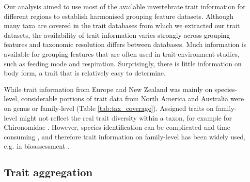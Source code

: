 \documentclass{article}
\begin{document}
Our analysis aimed to use most of the available invertebrate trait information for different regions to establish harmonised grouping feature datasets. Although many taxa are covered in the trait databases from which we extracted our trait datasets, the availability of trait information varies strongly across grouping features and taxonomic resolution differs between databases. Much information is available for grouping features that are often used in trait-environment studies, such as feeding mode and respiration. Surprisingly, there is little information on body form, a trait that is relatively easy to determine. 

While trait information from Europe and New Zealand was mainly on species-level, considerable portions of trait data from North America and Australia were on genus or family-level (Table \ref{tab:tax_coverage}). Assigned traits on family-level might not reflect the real trait diversity within a taxon, for example for Chironomidae \cite{serra_synthesising_2016}. However, species identification can be complicated and time-consuming \cite{marshall_taxonomic_2006, resh_which_2008}, and therefore trait information on family-level has been widely used, e.g. in bioassessment \cite{beketov_spear_2009}.




\subsection*{Trait aggregation}
\end{document}
